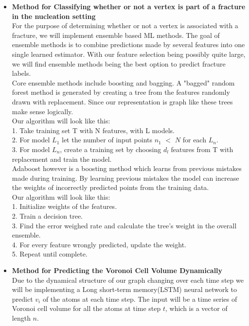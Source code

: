 \begin{itemize}
\begin{itemize}
\bigskip
\item \textbf{Method for Classifying whether or not a vertex is part of a fracture in the nucleation setting}
\bigskip
\\
For the purpose of determining whether or not a vertex is associated with a fracture, we will implement ensemble based ML methods. The goal of ensemble methods is to combine predictions made by several features into one single learned estimator. With our feature selection being possibly quite large, we will find ensemble methods being the best option to predict fracture labels. 
\bigskip
\\
Core ensemble methods include boosting and bagging. A "bagged" random forest method is generated by creating a tree from the features randomly drawn with replacement. Since our representation is graph like these trees make sense logically. 
\bigskip
\\
Our algorithm will look like this:
\\
1. Take training set T with N features, with L models.
\\
2. For model $L _{1}$ let the number of input points $n_{1}$ $<$ $N$ for each $L_{n}$.
\\
3. For model $L_{n}$, create a training set by choosing $d_{l}$ features from T with replacement and train the model.
\bigskip
\\
Adaboost however is a boosting method which learns from previous mistakes made during training. By learning previous mistakes the model can increase the weights of incorrectly predicted points from the training data. 
\bigskip
\\
Our algorithm will look like this:
\\
1. Initialize weights of the features. 
\\
2. Train a decision tree.
\\
3. Find the error weighed rate and calculate the tree's weight in the overall ensemble. 
\\
4. For every feature wrongly predicted, update the weight. 
\\
5. Repeat until complete. 
\item \textbf{Method for Predicting the Voronoi Cell Volume Dynamically}
\bigskip
\\
Due to the dynamical structure of our graph changing over each time step we will be implementing a Long short-term memory(LSTM) neural network to predict $v_i$ of the atoms at each time step. The input will be a time series of Voronoi cell volume for all the atoms at time step $t$, which is a vector of length $n$.


\end{itemize}
\end{itemize}
